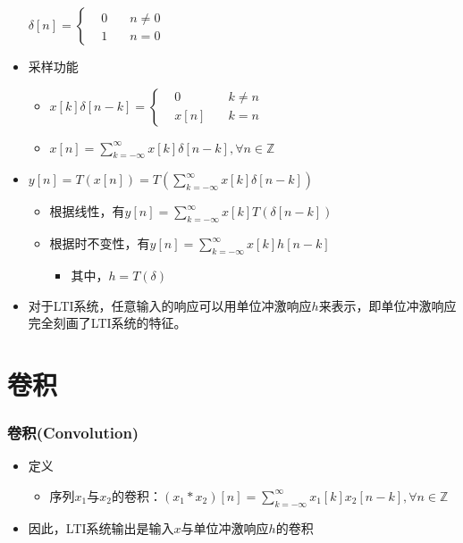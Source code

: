 \documentclass[CJKutf8,dvipsnames,table]{beamer}
\newif\ifxetexorluatex %
\begin{document}
\begin{CJK*}{UTF8}{song}
\begin{frame}
\begin{itemize}
    \begin{math}
\delta[n] = 
\left\{
    \begin {aligned}
         & 0 \quad & n \neq 0 \\
         & 1 \quad & n = 0                  
    \end{aligned}
\right.
	\end{math}    
 
    \item 采样功能
        \begin{itemize}
        \item 
    \begin{math}
x[k]\delta[n-k] = 
\left\{
    \begin {aligned}
         & 0 \quad & k \neq n \\
         & x[n] \quad & k = n                  
    \end{aligned}
\right.
	\end{math}     
        \item $x[n]=\sum_{k=-\infty}^{\infty}x[k]\delta[n-k], \forall n \in \mathbb{Z}$
        \end{itemize} 
        
    \item $y[n]=T(x[n])=T(\sum_{k=-\infty}^{\infty}x[k]\delta[n-k])$
        \begin{itemize}
        \item 根据线性，有$y[n]=\sum_{k=-\infty}^{\infty}x[k]T(\delta[n-k])$
        \item 根据时不变性，有$y[n]=\sum_{k=-\infty}^{\infty}x[k]h[n-k]$
            \begin{itemize}
            \item 其中，$h=T(\delta)$
            \end{itemize}
        \end{itemize}
    \item 对于LTI系统，任意输入的响应可以用单位冲激响应$h$来表示，即单位冲激响应完全刻画了LTI系统的特征。
    \end{itemize} 
  \end{frame}    
    

  \section{卷积}
      
  \begin{frame}
    \frametitle{卷积(Convolution)}
    \begin{itemize}
    \item 定义
        \begin{itemize}
        \item 序列$x_1$与$x_2$的卷积：$(x_1*x_2)[n]=\sum_{k=-\infty}^{\infty}x_1[k]x_2[n-k], \forall n \in \mathbb{Z}$
        \end{itemize}   
    \item 因此，LTI系统输出是输入$x$与单位冲激响应$h$的卷积
    \end{itemize} 
  \end{frame}     
    
\ifxetexorluatex\else
\end{CJK*}
\fi
\end{document}
